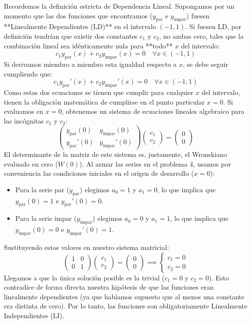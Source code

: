 \documentclass[11pt,spanish]{article}
\newcounter{problema}
\begin{document}
Recordemos la definición estricta de Dependencia Lineal. Supongamos por un momento que las dos funciones que encontramos ($y_{\text{par}}$ e $y_{\text{impar}}$) fuesen **Linealmente Dependientes (LD)** en el intervalo $(-1,1)$.
Si fuesen LD, por definición tendrían que existir dos constantes $c_1$ y $c_2$, no ambas cero, tales que la combinación lineal sea idénticamente nula para **todo** $x$ del intervalo:
$$c_1 y_{\text{par}}(x) + c_2 y_{\text{impar}}(x) = 0 \quad \forall x \in (-1,1)$$
Si derivamos miembro a miembro esta igualdad respecto a $x$, se debe seguir cumpliendo que:
$$c_1 y_{\text{par}}'(x) + c_2 y_{\text{impar}}'(x) = 0 \quad \forall x \in (-1,1)$$
Como estas dos ecuaciones se tienen que cumplir para cualquier $x$ del intervalo, tienen la obligación matemática de cumplirse en el punto particular $x = 0$. Si evaluamos en $x = 0$, obtenemos un sistema de ecuaciones lineales algebraico para las incógnitas $c_1$ y $c_2$:
$$\begin{pmatrix} y_{\text{par}}(0) & y_{\text{impar}}(0) \\ y_{\text{par}}'(0) & y_{\text{impar}}'(0) \end{pmatrix} \begin{pmatrix} c_1 \\ c_2 \end{pmatrix} = \begin{pmatrix} 0 \\ 0 \end{pmatrix}$$
El determinante de la matriz de este sistema es, justamente, el Wronskiano evaluado en cero ($W(0)$).
Al armar las series en el problema 4, usamos por conveniencia las condiciones iniciales en el origen de desarrollo ($x=0$):
\begin{itemize}
\item Para la serie par ($y_{\text{par}}$) elegimos $a_0=1$ y $a_1=0$, lo que implica que $y_{\text{par}}(0) = 1$ e $y_{\text{par}}'(0) = 0$.
\item Para la serie impar ($y_{\text{impar}}$) elegimos $a_0=0$ y $a_1=1$, lo que implica que $y_{\text{impar}}(0) = 0$ e $y_{\text{impar}}'(0) = 1$.
\end{itemize}
Sustituyendo estos valores en nuestro sistema matricial:
$$\begin{pmatrix} 1 & 0 \\ 0 & 1 \end{pmatrix} \begin{pmatrix} c_1 \\ c_2 \end{pmatrix} = \begin{pmatrix} 0 \\ 0 \end{pmatrix} \implies \begin{cases} c_1 = 0 \\ c_2 = 0 \end{cases}$$
Llegamos a que la única solución posible es la trivial ($c_1 = 0$ y $c_2 = 0$). Esto contradice de forma directa nuestra hipótesis de que las funciones eran linealmente dependientes (ya que habíamos supuesto que al menos una constante era distinta de cero).
Por lo tanto, las funciones son obligatoriamente Linealmente Independientes (LI).
\end{document}
